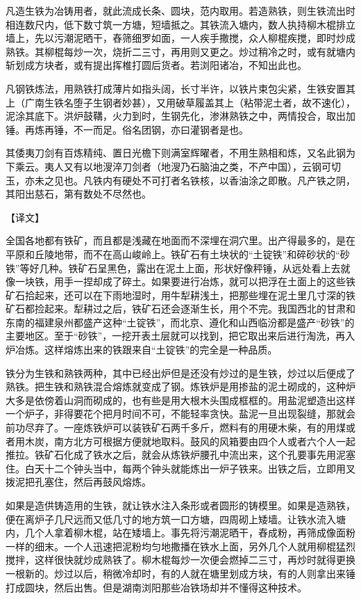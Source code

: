 \documentclass[12pt,UTF8]{ctexbook}
\begin{document}
凡造生铁为冶铸用者，就此流成长条、圆块，范内取用。若造熟铁，则生铁流出时相连数尺内，低下数寸筑一方塘，短墙抵之。其铁流入塘内，数人执持柳木棍排立墙上，先以污潮泥晒干，舂筛细罗如面，一人疾手撒搅，众人柳棍疾搅，即时炒成熟铁。其柳棍每炒一次，烧折二三寸，再用则又更之。炒过稍冷之时，或有就塘内斩划成方块者，或有提出挥椎打圆后货者。若浏阳诸冶，不知出此也。

凡钢铁炼法，用熟铁打成薄片如指头阔，长寸半许，以铁片束包尖紧，生铁安置其上（广南生铁名堕子生钢者妙甚），又用破草履盖其上（粘带泥土者，故不速化），泥涂其底下。洪炉鼓鞲，火力到时，生钢先化，渗淋熟铁之中，两情投合，取出加锤。再炼再锤，不一而足。俗名团钢，亦曰灌钢者是也。

其倭夷刀剑有百炼精纯、置日光檐下则满室辉曜者，不用生熟相和炼，又名此钢为下乘云。夷人又有以地溲淬刀剑者（地溲乃石脑油之类，不产中国），云钢可切玉，亦未之见也。凡铁内有硬处不可打者名铁核，以香油涂之即散。凡产铁之阴，其阳出慈石，第有数处不尽然也。

【译文】

全国各地都有铁矿，而且都是浅藏在地面而不深埋在洞穴里。出产得最多的，是在平原和丘陵地带，而不在高山峻岭上。铁矿石有土块状的“土锭铁”和碎砂状的“砂铁”等好几种。铁矿石呈黑色，露出在泥土上面，形状好像秤锤，从远处看上去就像一块铁，用手一捏却成了碎土。如果要进行冶炼，就可以把浮在土面上的这些铁矿石拾起来，还可以在下雨地湿时，用牛犁耕浅土，把那些埋在泥土里几寸深的铁矿石都捡起来。犁耕过之后，铁矿石还会逐渐生长，用个不完。我国西北的甘肃和东南的福建泉州都盛产这种“土锭铁”，而北京、遵化和山西临汾都是盛产“砂铁”的主要地区。至于“砂铁”，一挖开表土层就可以找到，把它取出来后进行淘洗，再入炉冶炼。这样熔炼出来的铁跟来自“土锭铁”的完全是一种品质。

铁分为生铁和熟铁两种，其中已经出炉但是还没有炒过的是生铁，炒过以后便成了熟铁。把生铁和熟铁混合熔炼就变成了钢。炼铁炉是用掺盐的泥土砌成的，这种炉大多是依傍着山洞而砌成的，也有些是用大根木头围成框框的。用盐泥塑造出这样一个炉子，非得要花个把月时间不可，不能轻率贪快。盐泥一旦出现裂缝，那就会前功尽弃了。一座炼铁炉可以装铁矿石两千多斤，燃料有的用硬木柴，有的用煤或者用木炭，南方北方可根据方便就地取料。鼓风的风箱要由四个人或者六个人一起推拉。铁矿石化成了铁水之后，就会从炼铁炉腰孔中流出来，这个孔要事先用泥塞住。白天十二个钟头当中，每两个钟头就能炼出一炉子铁来。出铁之后，立即用叉拨泥把孔塞住，然后再鼓风熔炼。

如果是造供铸造用的生铁，就让铁水注入条形或者圆形的铸模里。如果是造熟铁，便在离炉子几尺远而又低几寸的地方筑一口方塘，四周砌上矮墙。让铁水流入塘内，几个人拿着柳木棍，站在矮墙上。事先将污潮泥晒干，舂成粉，再筛成像面粉一样的细末。一个人迅速把泥粉均匀地撒播在铁水上面，另外几个人就用柳棍猛烈搅拌，这样很快就炒成熟铁了。柳木棍每炒一次便会燃掉二三寸，再炒时就得更换一根新的。炒过以后，稍微冷却时，有的人就在塘里划成方块，有的人则拿出来锤打成圆块，然后出售。但是湖南浏阳那些冶铁场却并不懂得这种技术。
\end{document}
